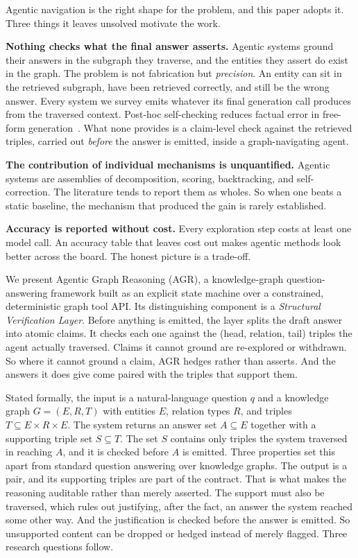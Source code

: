 Agentic navigation is the right shape for the problem, and this paper adopts it.
Three things it leaves unsolved motivate the work.

\textbf{Nothing checks what the final answer asserts.} Agentic systems ground
their answers in the subgraph they traverse, and the entities they assert do
exist in the graph. The problem is not fabrication but \emph{precision}. An
entity can sit in the retrieved subgraph, have been retrieved correctly, and
still be the wrong answer. Every system we survey emits whatever its final
generation call produces from the traversed context. Post-hoc self-checking
reduces factual error in free-form generation~\cite{dhuliawala2024chain}. What
none provides is a claim-level check against the retrieved triples, carried out
\emph{before} the answer is emitted, inside a graph-navigating agent.

\textbf{The contribution of individual mechanisms is unquantified.} Agentic
systems are assemblies of decomposition, scoring, backtracking, and
self-correction. The literature tends to report them as wholes. So when one
beats a static baseline, the mechanism that produced the gain is rarely
established.

\textbf{Accuracy is reported without cost.} Every exploration step costs at
least one model call. An accuracy table that leaves cost out makes agentic
methods look better across the board. The honest picture is a trade-off.

We present Agentic Graph Reasoning (AGR), a knowledge-graph question-answering
framework built as an explicit state machine over a constrained, deterministic
graph tool API. Its distinguishing component is a \emph{Structural Verification
Layer}. Before anything is emitted, the layer splits the draft answer into
atomic claims. It checks each one against the (head, relation, tail) triples the
agent actually traversed. Claims it cannot ground are re-explored or withdrawn.
So where it cannot ground a claim, AGR hedges rather than asserts. And the
answers it does give come paired with the triples that support them.

Stated formally, the input is a natural-language question $q$ and a knowledge
graph $G = (E, R, T)$ with entities $E$, relation types $R$, and triples $T
\subseteq E \times R \times E$. The system returns an answer set $A \subseteq E$
together with a supporting triple set $S \subseteq T$. The set $S$ contains only
triples the system traversed in reaching $A$, and it is checked before $A$ is
emitted. Three properties set this apart from standard question answering over
knowledge graphs. The output is a pair, and its supporting triples are part of
the contract. That is what makes the reasoning auditable rather than merely
asserted. The support must also be traversed, which rules out justifying, after
the fact, an answer the system reached some other way. And the justification is
checked before the answer is emitted. So unsupported content can be dropped or
hedged instead of merely flagged. Three research questions follow.

